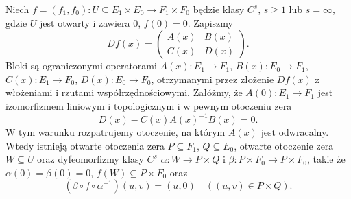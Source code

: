 \begin{twierdzenie}
\label{ma2:thm:rank-banach-block}
Niech $f=(f_1,f_0):U\subseteq E_1\times E_0
\to F_1\times F_0$ będzie klasy $C^s$, $s\ge1$
lub $s=\infty$, gdzie $U$ jest otwarty i zawiera $0$,
$f(0)=0$. Zapiszmy
\[
 Df(x)=
 \begin{pmatrix} A(x)&B(x)\\ C(x)&D(x)\end{pmatrix}.
\]
Bloki są ograniczonymi operatorami
$A(x):E_1\to F_1$, $B(x):E_0\to F_1$,
$C(x):E_1\to F_0$, $D(x):E_0\to F_0$,
otrzymanymi przez złożenie $Df(x)$ z włożeniami
i rzutami współrzędnościowymi.
Załóżmy, że $A(0):E_1\to F_1$ jest izomorfizmem
liniowym i topologicznym i w pewnym otoczeniu zera
\[
 D(x)-C(x)A(x)^{-1}B(x)=0.
\]
W tym warunku rozpatrujemy otoczenie, na którym
$A(x)$ jest odwracalny. Wtedy istnieją otwarte otoczenia zera $P\subseteq F_1$,
$Q\subseteq E_0$, otwarte otoczenie zera $W\subseteq U$
oraz dyfeomorfizmy klasy $C^s$
$\alpha:W\to P\times Q$ i
$\beta:P\times F_0\to P\times F_0$, takie że
$\alpha(0)=\beta(0)=0$, $f(W)\subseteq P\times F_0$ oraz
\[
 (\beta\circ f\circ\alpha^{-1})(u,v)=(u,0)
 \quad ((u,v)\in P\times Q).
\]
\end{twierdzenie}
